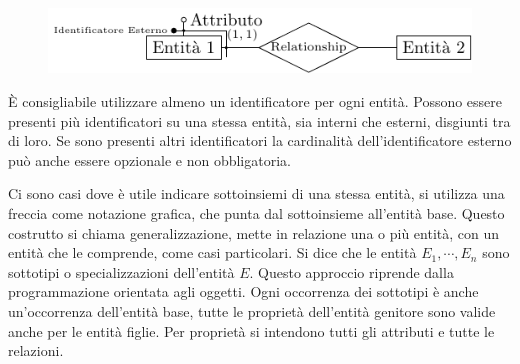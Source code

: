 \documentclass{article}
\numberwithin{equation}{subsection}
\begin{document}
\begin{figure}[H]%
    \centering%
    \includegraphics[scale=1.25]{identificatore_esterno.pdf}%
\end{figure}

\`{E} consigliabile utilizzare almeno un identificatore per 
ogni entità. Possono essere presenti più identificatori su una 
stessa entità, sia interni che esterni, disgiunti tra di loro. Se sono presenti altri identificatori la cardinalità 
dell'identificatore esterno può anche essere opzionale e non 
obbligatoria. 



Ci sono casi dove è utile indicare sottoinsiemi di una stessa entità, si utilizza una freccia come notazione grafica, che punta dal sottoinsieme all'entità base. 
Questo costrutto si chiama generalizzazione, mette in relazione una o più entità, con un entità che le comprende, come casi particolari. Si dice che le entità $E_1,\cdots,E_n$ sono 
sottotipi o specializzazioni dell'entità $E$. Questo approccio riprende dalla programmazione orientata agli oggetti. 
Ogni occorrenza dei sottotipi è anche un'occorrenza dell'entità base, tutte le proprietà dell'entità genitore sono valide anche per le entità figlie. Per proprietà 
si intendono tutti gli attributi e tutte le relazioni. 
\end{document}
